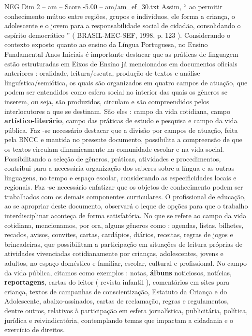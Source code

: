 \begin{textsample}{NEG Dim 2 – am – Score -5.00 – am/am\_ef\_30.txt}
Assim, “ ao permitir conhecimento mútuo entre regiões, grupos e indivíduos, ele forma a criança, o adolescente e o jovem para a responsabilidade social de cidadão, consolidando o espírito democrático ” ( BRASIL-MEC-SEF, 1998, p. 123 ).
Considerando o contexto exposto quanto ao ensino da Língua Portuguesa, no Ensino Fundamental Anos Iniciais é importante destacar que as práticas de linguagem estão estruturadas em Eixos de Ensino já mencionados em documentos oficiais anteriores : oralidade, leitura/escuta, produção de textos e análise linguística/semiótica, os quais são organizados em quatro campos de atuação, que podem ser entendidos como esfera social no interior das quais os gêneros se inserem, ou seja, são produzidos, circulam e são compreendidos pelos interlocutores a que se destinam.
São eles : campo da vida cotidiana, campo \textbf{artístico-literário}, campo das práticas de estudo e pesquisa e campo da vida pública.
Faz -se necessário destacar que a divisão por campos de atuação, feita pela BNCC e mantida no presente documento, possibilita a compreensão de que os textos circulam dinamicamente na comunidade escolar e na vida social.
Possibilitando a seleção de gêneros, práticas, atividades e procedimentos, contribui para a necessária organização dos saberes sobre a língua e as outras linguagens, no tempo e espaço escolar, considerando as especificidades locais e regionais.
Faz -se necessário enfatizar que os objetos de conhecimento podem ser trabalhados com os demais componentes curriculares.
O profissional de educação, ao se apropriar deste documento, observará o leque de opções para que o trabalho interdisciplinar aconteça de forma satisfatória.
No que se refere ao campo da vida cotidiana, mencionamos, por ora, alguns gêneros como : agendas, listas, bilhetes, recados, avisos, convites, cartas, cardápios, diários, receitas, regras de jogos e brincadeiras, que possibilitam a participação em situações de leitura próprias de atividades vivenciadas cotidianamente por crianças, adolescentes, jovens e adultos, no espaço doméstico e familiar, escolar, cultural e profissional.
No campo da vida pública, citamos como exemplos : notas, \textbf{álbuns} noticiosos, notícias, \textbf{reportagens}, cartas do leitor ( revista infantil ), comentários em sites para criança, textos de campanhas de conscientização, Estatuto da Criança e do Adolescente, abaixo-assinados, cartas de reclamação, regras e regulamentos, dentre outros, relativos à participação em esfera jornalística, publicitária, política, jurídica e reivindicatória, contemplando temas que impactam a cidadania e o exercício de direitos.

\end{textsample}
